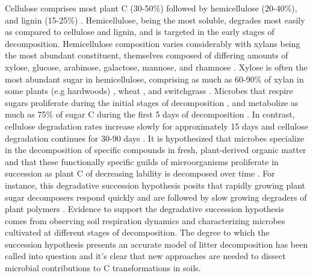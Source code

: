 Cellulose comprises most plant C (30-50\%) followed by hemicellulose (20-40\%),
and lignin (15-25\%) \citep{Lynd2002}. Hemicellulose, being the most soluble,
degrades most easily as compared to cellulose and lignin, and is targeted in
the early stages of decomposition. Hemicellulose composition varies
considerably with xylans being the most abundant constituent, themselves
composed of differing amounts of xylose, glucose, arabinose, galactose,
mannose, and rhamnose \citep{Saha2003}. Xylose is often the most abundant sugar
in hemicellulose, comprising as much as 60-90\% of xylan in some plants (e.g
hardwoods) \citep{Spiridon2008}, wheat \citep{Sun2005}, and switchgrass
\citep{Bunnell2013}. Microbes that respire sugars proliferate during the
initial stages of decomposition \citep{Garrett1951,Alexander1964}, and
metabolize as much as 75\% of sugar C during the first 5 days of decomposition
\citep{Engelking2007}. In contrast, cellulose degradation rates increase slowly
for approximately 15 days and cellulose degradation continues for 30-90 days
\citep{Hu1997,Engelking2007}. It is hypothesized that microbes specialize in
the decomposition of specific compounds in fresh, plant-derived organic matter
and that these functionally specific guilds of microorganisms proliferate in
succession as plant C of decreasing lability is decomposed over time
\citep{Hu1997,Rui2009,AnneliseHKjoller2002,Bastian2009}. For instance, this
degradative succession hypothesis posits that rapidly growing plant sugar
decomposers respond quickly \citep{Garrett1963,Bremer1994} and are followed by
slow growing degraders of plant polymers \citep{Garrett1963}. Evidence to
support the degradative succession hypothesis comes from observing soil
respiration dynamics and characterizing microbes cultivated at different stages
of decomposition. The degree to which the succession hypothesis presents an
accurate model of litter decomposition has been called into question
\citep{AnneliseHKjoller2002,Frankland1998,Osono_2005} and it's clear that new
approaches are needed to dissect microbial contributions to C transformations
in soils.

